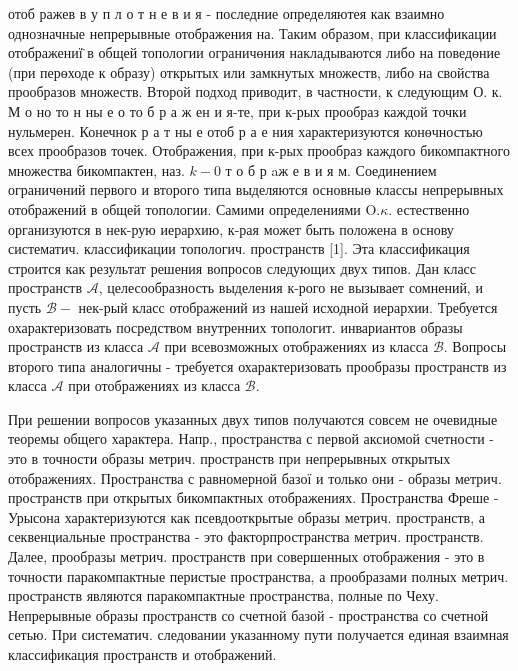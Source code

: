 \documentclass[10pt]{article}
\begin{document}
отоб ражев в у п л о т н е в и я - последние определяютея как взаимно однозначные непрерывные отображения на. Таким образом, при классификации отображениї̈ в общей топологии ограничөния накладываются либо на поведөние (при перөходе к образу) открытых или замкнутых множеств, либо на свойства прообразов множеств. Второй подход приводит, в частности, к следующим $О$. к. М о но то н ны е о то б р а ж ен и я-те, при к-рых прообраз каждой точки нульмерен. Конечнок р а т ны е отоб р а е ния характеризуются конөчностью всех прообразов точек. Отображения, при к-рых прообраз каждого бикомпактного множества бикомпактен, наз. $k-0$ т о б р aж е в и я м. Соединением ограничөний первого и второго типа выделяются основныө классы непрерывных отображений в общей топологии. Самими определениями $\mathrm{O} . \kappa$. естественно организуются в нек-рую иерархию, к-рая может быть положена в основу систематич. классификации топологич. пространств [1]. Эта классификация строится как результат решения вопросов следующих двух типов. Дан класс пространств $\mathcal{A}$, целесообразность выделения к-рого не вызывает сомнений, и пусть $\mathscr{B}-$ нек-рый класс отображений из нашей исходной иерархии. Требуется охарактеризовать посредством внутренних топологит. инвариантов образы пространств из класса $\mathcal{A}$ при всевозможных отображениях из класса $\mathscr{B}$. Вопросы второго типа аналогичны - требуется охарактеризовать прообразы пространств из класса $\mathcal{A}$ при отображениях из класса $\mathscr{B}$.



При решении вопросов указанных двух типов получаются совсем не очевидные теоремы общего характера. Напр., пространства с первой аксиомой счетности - это в точности образы метрич. пространств при непрерывных открытых отображениях. Пространства с равномерной базої и только они - образы метрич. пространств при открытых бикомпактных отображениях. Пространства Фреше - Урысона характеризуются как псевдооткрытые образы метрич. пространств, а секвенциальные пространства - это факторпространства метрич. пространств. Далее, прообразы метрич. пространств при совершенных отображения - это в точности паракомпактные перистые пространства, а прообразами полных метрич. пространств являются паракомпактные пространства, полные по Чеху. Непрерывные образы пространств со счетной базой - пространства со счетной сетью. При систематич. следовании указанному пути получается единая взаимная классификация пространств и отображений.
\end{document}
